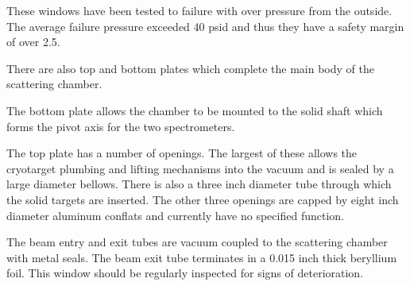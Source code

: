These windows have been tested to failure with over pressure from the
outside.  The average failure pressure exceeded 40 psid and thus they
have a safety margin of over 2.5.  

There are also top and bottom plates which complete the main body of the
scattering chamber.

The bottom plate allows the chamber to be mounted to the
solid shaft which forms the pivot axis for the two spectrometers.


The top plate has a number of openings. The largest of these allows
the cryotarget plumbing and lifting mechanisms into the vacuum and is sealed by
a large diameter bellows. There is also a three inch diameter tube through
which the solid targets are inserted.
The other three openings are capped by eight inch diameter aluminum
conflats and currently have no specified function.

The beam entry and exit tubes are vacuum coupled to the scattering chamber with
metal seals. The beam exit tube terminates in a 0.015 inch thick beryllium foil.
This window should be regularly inspected for signs of deterioration.

